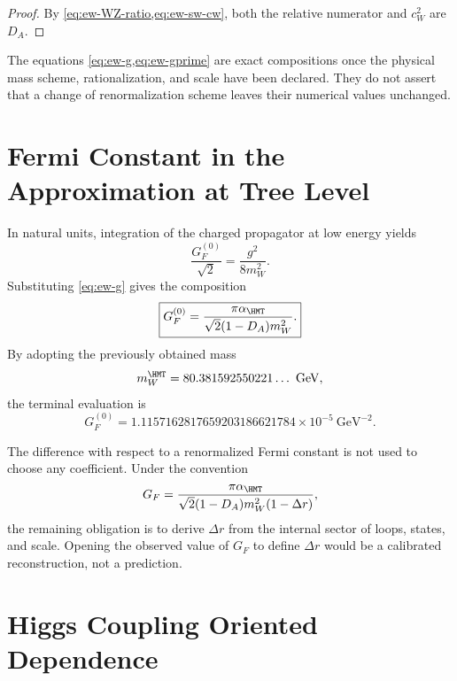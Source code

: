 \begin{proof}
By \cref{eq:ew-WZ-ratio,eq:ew-sw-cw}, both the relative numerator and
\(c_W^2\) are \(D_A\).
\end{proof}

The equations \cref{eq:ew-g,eq:ew-gprime} are exact compositions once the
physical mass scheme, rationalization, and scale have been declared. They do not
assert that a change of renormalization scheme leaves their
numerical values unchanged.

\section{Fermi Constant in the Approximation at Tree Level}

In natural units, integration of the charged propagator at low
energy yields
\begin{equation}
\label{eq:ew-GF-def}
\frac{G_F^{(0)}}{\sqrt2}=\frac{g^2}{8m_W^2}.
\end{equation}
Substituting \cref{eq:ew-g} gives the composition
\begin{equation}
\label{eq:ew-GF}
\boxed{
G_F^{(0)}
=\frac{\pi\alpha_{\HMT}}
{\sqrt2(1-D_A)m_W^2}.}
\end{equation}
By adopting the previously obtained mass
\begin{equation}
\label{eq:ew-W-output}
m_W^{\HMT}=80.381592550221\ldots\ \mathrm{GeV},
\end{equation}
the terminal evaluation is
\begin{equation}
\label{eq:ew-GF-value}
\boxed{
G_F^{(0)}
=1.1157162817659203186621784\times10^{-5}\ \mathrm{GeV}^{-2}.}
\end{equation}

The difference with respect to a renormalized Fermi constant is not used
to choose any coefficient. Under the convention
\begin{equation}
\label{eq:ew-Delta-r}
G_F
=\frac{\pi\alpha_{\HMT}}
{\sqrt2(1-D_A)m_W^2(1-\Delta r)},
\end{equation}
the remaining obligation is to derive \(\Delta r\) from the internal sector of
loops, states, and scale. Opening the observed value of \(G_F\) to define
\(\Delta r\) would be a calibrated reconstruction, not a prediction.

\section{Higgs Coupling Oriented Dependence}

